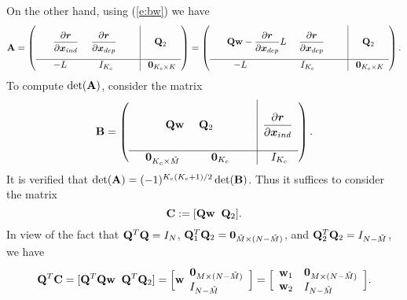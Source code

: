 \documentclass[ amsmath,amssymb,nofootinbib
]{revtex4-1}
\def\mbf#1{\mbox{\boldmath $#1$}}
\newcommand{\bQ}{{\bf Q}}
\newcommand{\bw}{{\bf w}}
\newcommand{\br}{{\mbf r}}
\newcommand{\tM}{{\tilde M}}
\newcommand{\p}{\partial}
\begin{document}
On the other hand, using (\ref{e:bw}) we have
\begin{align*}
{\bf A} =
\left(
\begin{array}{cccc|c }
&&&&  \\
&\mbox{\smash{ $ \dfrac{\p \br  }{\p {\mbf x_{ind}}}$   \quad  $\dfrac{\p \br }{\p {\mbf x_{dep}}}$}}&&&{ \bQ_2  }\\
&&&& \\\hline
&-L   \hspace{1.2 cm}  I_{K_c} &&&\mbox{\smash{\ ${\bf 0}_{K_c \times K}$}} \\
\end{array}
\right)
=
\left(
\begin{array}{cccc|c }
&&&&  \\
&\mbox{\smash{ $\bQ\bw -  \dfrac{\p \br  }{\p {\mbf x_{dep}}}L$   \quad  $\dfrac{\p \br }{\p {\mbf x_{dep}}}$}}&&&{ \bQ_2  }\\
&&&& \\\hline
&-L   \hspace{2 cm}  I_{K_c} &&&\mbox{\smash{\ ${\bf 0}_{K_c \times K}$}} \\
\end{array}
\right). %
\end{align*}
To compute $\det({\bf A})$,
consider the matrix
\begin{align*}
{\bf B} =
\left(
\begin{array}{cccc|c }
&&&&  \\
&\mbox{\smash{ $\bQ\bw$   \quad  $\bQ_2$}}
            &&& \dfrac{\p \br }{\p {\mbf x_{ind}}}\\
&&&& \\\hline
& {\bf 0}_{K_c \times \tM}    \hspace{1 cm}  {\bf 0}_{K_c} &&&\mbox{\smash{\ $I_{K_c}$}} \\
\end{array}
\right). %
\end{align*}
It is verified that $\det({\bf A}) = (-1)^{K_c(K_c + 1)/2} \det({\bf B})$.
Thus it suffices to consider the matrix
$$
   {\bf C} := [\bQ\bw  \;\;   \bQ_2].
$$
In view of the fact that $\bQ^T \bQ = I_N$,
$\bQ_1^T \bQ_2  = {\bf 0}_{\tM \times (N-\tM)}$,
and $\bQ_2^T \bQ_2 =I_{N-\tM}$,
we have
$$
   \bQ^T {\bf C} = [\bQ^T \bQ \bw  \;\; \bQ^T \bQ_2]
                 = \Big[\bw  \begin{array}{l}
                       {\bf 0}_{M \times (N - \tM)} \\
                        I_{N - \tM}\\
                    \end{array}\Big]
                   =  \Big[ \begin{array}{l}
                       \bw_1 \\
                        \bw_2\\
                    \end{array}  \begin{array}{l}
                       {\bf 0}_{M \times (N - \tM)} \\
                        I_{N - \tM}\\
                    \end{array}\Big].
$$
\end{document}
